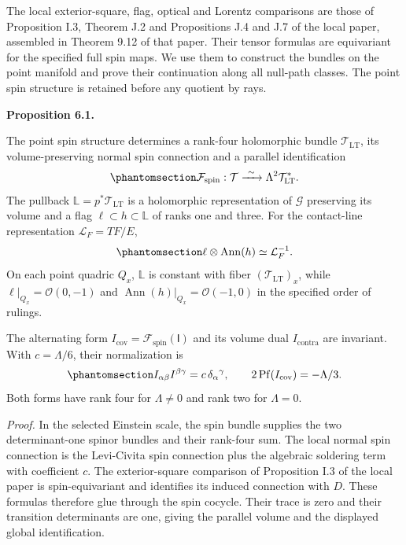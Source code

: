 \documentclass[
  english,
  11pt,
  reqno]{amsart}
\makeatletter
\newcommand{\pandocstatementheading}[1]{%
  \par\addpenalty{\@beginparpenalty}%
  \addvspace{.5\baselineskip plus .2\baselineskip minus .2\baselineskip}%
  {\normalfont\bfseries #1\par}%
  \nobreak\@afterindenttrue\@afterheading
}
\makeatother
\begin{document}
The local exterior-square, flag, optical and Lorentz comparisons are
those of Proposition I.3, Theorem J.2 and Propositions J.4 and J.7 of
the local paper, assembled in Theorem 9.12 of that paper. Their tensor
formulas are equivariant for the specified full spin maps. We use them
to construct the bundles on the point manifold and prove their
continuation along all null-path classes. The point spin structure is
retained before any quotient by rays.

\pandocstatementheading{\protect{}\label{prop:global-local-twistor-monodromy}Proposition 6.1.}

The point spin structure determines a rank-four holomorphic bundle
\(\mathcal T_{\mathrm{LT}}\), its volume-preserving normal spin
connection and a parallel identification
\begin{equation}\protect\phantomsection\label{eq:global-spin-exterior-square}{
\mathcal F_{\mathrm{spin}}:\mathcal T
\xrightarrow{\ \sim\ }\Lambda^2\mathcal T_{\mathrm{LT}}^*.
}\end{equation} The pullback \(\mathbb L=p^*\mathcal T_{\mathrm{LT}}\)
is a holomorphic representation of \(\mathcal G\) preserving its volume
and a flag \(\ell\subset h\subset\mathbb L\) of ranks one and three. For
the contact-line representation \(\mathcal L_F=TF/E\),
\begin{equation}\protect\phantomsection\label{eq:global-spin-flag-contact-line}{
\ell\otimes\operatorname{Ann}(h)\simeq\mathcal L_F^{-1}.
}\end{equation} On each point quadric \(Q_x\), \(\mathbb L\) is constant
with fiber \((\mathcal T_{\mathrm{LT}})_x\), while
\(\ell|_{Q_x}=\mathcal O(0,-1)\) and
\(\operatorname{Ann}(h)|_{Q_x}=\mathcal O(-1,0)\) in the specified order
of rulings.

The alternating form
\(I_{\mathrm{cov}}=\mathcal F_{\mathrm{spin}}(\mathsf I)\) and its
volume dual \(I_{\mathrm{contra}}\) are invariant. With \(c=\Lambda/6\),
their normalization is
\begin{equation}\protect\phantomsection\label{eq:global-infinity-pair-normalization}{
I_{\alpha\beta}I^{\beta\gamma}
=c\,\delta_\alpha{}^\gamma,
\qquad
2\operatorname{Pf}(I_{\mathrm{cov}})=-\Lambda/3.
}\end{equation} Both forms have rank four for \(\Lambda\ne0\) and rank
two for \(\Lambda=0\).

\emph{Proof.} In the selected Einstein scale, the spin bundle supplies
the two determinant-one spinor bundles and their rank-four sum. The
local normal spin connection is the Levi-Civita spin connection plus the
algebraic soldering term with coefficient \(c\). The exterior-square
comparison of Proposition I.3 of the local paper is spin-equivariant and
identifies its induced connection with \(D\). These formulas therefore
glue through the spin cocycle. Their trace is zero and their transition
determinants are one, giving the parallel volume and the displayed
global identification.
\end{document}
